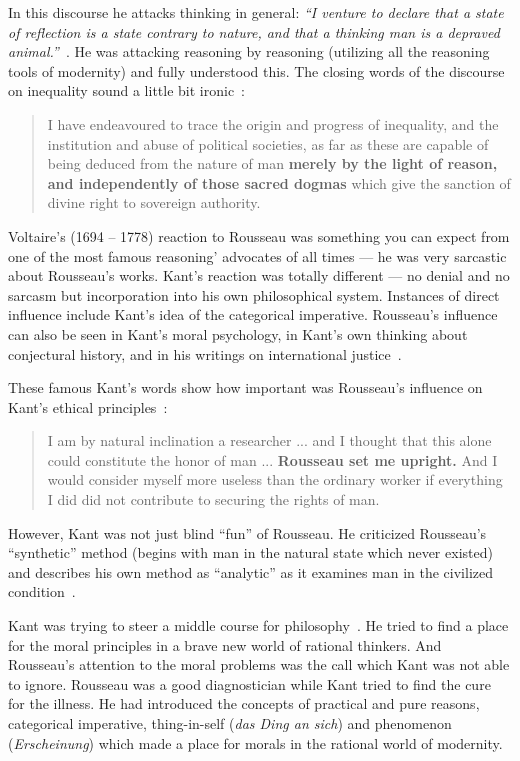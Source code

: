 \documentclass{article}
\begin{document}
In this discourse he attacks thinking in general: \textit{``I venture to declare that a state of reflection is a state contrary to nature, and that a thinking man is a depraved animal.''}~\cite{discourse2}. He was attacking reasoning by reasoning (utilizing all the reasoning tools of modernity) and fully understood this. The closing words of the discourse on inequality sound a little bit ironic~\cite{discourse2}:

\begin{quote}
I have endeavoured to trace
the origin and progress of inequality, and the institution and abuse of political societies, as far as these are capable of being deduced from the nature of man
\textbf{merely by the light of reason, and independently of those sacred dogmas} which give the sanction of divine right to sovereign authority.
\end{quote}

Voltaire's (1694 -- 1778) reaction to Rousseau was something you can expect from one of the most famous reasoning' advocates of all times --- he was very sarcastic about Rousseau's works.
Kant's reaction was totally different --- no denial and no sarcasm but incorporation into his own philosophical system. Instances of direct influence include Kant's idea of
the categorical imperative. Rousseau's influence can also be seen in Kant's moral psychology, in Kant's own thinking about conjectural history, and in his writings on international
justice~\cite{stanford}.

These famous Kant's words show how important was Rousseau's influence on Kant's ethical principles~\cite{propagator}:
\begin{quote}
I am by natural inclination a researcher ... and I thought that this alone could constitute the honor of man ... \textbf{Rousseau set me upright.} And I would consider myself more useless than
the ordinary worker if everything I did did not contribute to securing the rights of man.
\end{quote}

However, Kant was not just blind ``fun'' of Rousseau. He criticized Rousseau's ``synthetic'' method (begins with man in the natural state which never existed)
and describes his own method as ``analytic'' as it examines man in the civilized condition~\cite{clewis}.

Kant was trying to steer a middle course for philosophy~\cite{Roth}. He tried to find a place for the moral principles in a brave new world of rational thinkers. And Rousseau's attention
to the moral problems was the call which Kant was not able to ignore. Rousseau was a good diagnostician while Kant tried to find the cure for the illness. He had introduced the concepts
of practical and pure reasons, categorical imperative, thing-in-self (\textsl{das Ding an sich}) and phenomenon (\textsl{Erscheinung}) which made a place for morals in the rational world of modernity.
\end{document}
